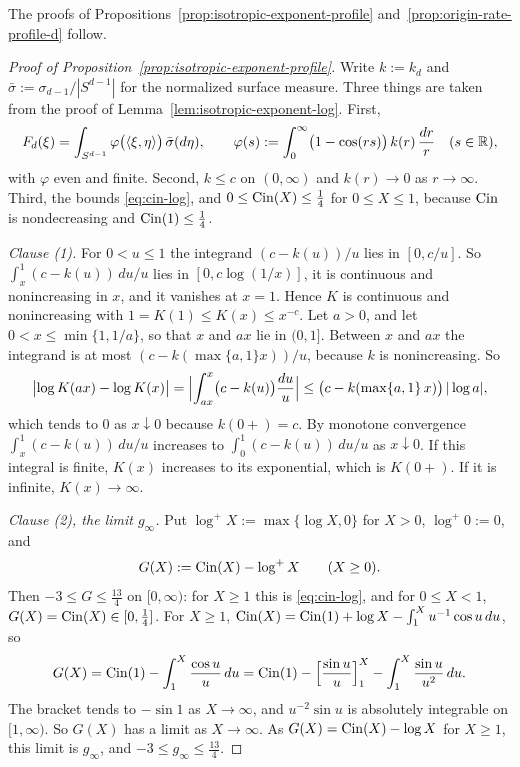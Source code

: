 The proofs of Propositions~\ref{prop:isotropic-exponent-profile}
and~\ref{prop:origin-rate-profile-d} follow.

\begin{proof}[Proof of Proposition~\ref{prop:isotropic-exponent-profile}]
Write $k := k_d$ and $\bar\sigma := \sigma_{d-1}/|S^{d-1}|$ for the normalized surface measure.
Three things are taken from the proof of Lemma~\ref{lem:isotropic-exponent-log}. First,
\[
  F_d(\xi) = \int_{S^{d-1}}\varphi\bigl(\langle\xi,\eta\rangle\bigr)\,\bar\sigma(d\eta),
  \qquad
  \varphi(s) := \int_0^\infty\bigl(1 - \cos(rs)\bigr)\,k(r)\,\frac{dr}{r} \quad (s \in \mathbb{R}),
\]
with $\varphi$ even and finite. Second, $k \le c$ on $(0,\infty)$ and $k(r) \to 0$ as
$r \to \infty$. Third, the bounds \ref{eq:cin-log}, and $0 \le \operatorname{Cin}(X) \le \tfrac14$ for
$0 \le X \le 1$, because $\operatorname{Cin}$ is nondecreasing and $\operatorname{Cin}(1) \le \tfrac14$.

\emph{Clause (1).} For $0 < u \le 1$ the integrand $(c - k(u))/u$ lies in $[0, c/u]$. So
$\int_x^1 (c - k(u))\,du/u$ lies in $[0, c\log(1/x)]$, it is continuous and nonincreasing in $x$,
and it vanishes at $x = 1$. Hence $K$ is continuous and nonincreasing with
$1 = K(1) \le K(x) \le x^{-c}$. Let $a > 0$, and let $0 < x \le \min\{1, 1/a\}$, so that $x$ and
$ax$ lie in $(0,1]$. Between $x$ and $ax$ the integrand is at most $(c - k(\max\{a,1\}x))/u$,
because $k$ is nonincreasing. So
\[
  \bigl|\log K(ax) - \log K(x)\bigr| = \Bigl|\int_{ax}^{x}\bigl(c - k(u)\bigr)\frac{du}{u}\Bigr|
   \le \bigl(c - k(\max\{a,1\}\,x)\bigr)\,|\log a| ,
\]
which tends to $0$ as $x \downarrow 0$ because $k(0{+}) = c$. By monotone convergence
$\int_x^1 (c - k(u))\,du/u$ increases to $\int_0^1 (c - k(u))\,du/u$ as $x \downarrow 0$. If this
integral is finite, $K(x)$ increases to its exponential, which is $K(0{+})$. If it is infinite,
$K(x) \to \infty$.

\emph{Clause (2), the limit $g_\infty$.} Put $\log^+ X := \max\{\log X, 0\}$ for $X > 0$,
$\log^+ 0 := 0$, and
\[
  G(X) := \operatorname{Cin}(X) - \log^+ X \qquad (X \ge 0) .
\]
Then $-3 \le G \le \tfrac{13}{4}$ on $[0,\infty)$: for $X \ge 1$ this is \ref{eq:cin-log}, and for
$0 \le X < 1$, $G(X) = \operatorname{Cin}(X) \in [0,\tfrac14]$. For $X \ge 1$,
$\operatorname{Cin}(X) = \operatorname{Cin}(1) + \log X - \int_1^X u^{-1}\cos u\,du$, so
\[
  G(X) = \operatorname{Cin}(1) - \int_1^X \frac{\cos u}{u}\,du
       = \operatorname{Cin}(1) - \Bigl[\frac{\sin u}{u}\Bigr]_1^X - \int_1^X \frac{\sin u}{u^2}\,du .
\]
The bracket tends to $-\sin 1$ as $X \to \infty$, and $u^{-2}\sin u$ is absolutely integrable on
$[1,\infty)$. So $G(X)$ has a limit as $X \to \infty$. As $G(X) = \operatorname{Cin}(X) - \log X$ for $X \ge 1$,
this limit is $g_\infty$, and $-3 \le g_\infty \le \tfrac{13}{4}$.


\end{proof}
